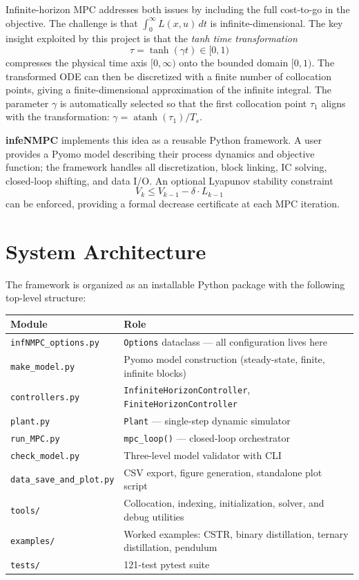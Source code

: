 \documentclass[11pt,letterpaper]{article}
\begin{document}
Infinite-horizon MPC addresses both issues by including the full cost-to-go in the objective. The challenge is that $\int_0^\infty L(x,u)\,dt$ is infinite-dimensional. The key insight exploited by this project is that the \emph{tanh time transformation}
\[
  \tau = \tanh(\gamma t) \in [0,1)
\]
compresses the physical time axis $[0,\infty)$ onto the bounded domain $[0,1)$. The transformed ODE can then be discretized with a finite number of collocation points, giving a finite-dimensional approximation of the infinite integral. The parameter $\gamma$ is automatically selected so that the first collocation point $\tau_1$ aligns with the transformation: $\gamma = \operatorname{atanh}(\tau_1)/T_s$.

\textbf{infeNMPC} implements this idea as a reusable Python framework. A user provides a Pyomo model describing their process dynamics and objective function; the framework handles all discretization, block linking, IC solving, closed-loop shifting, and data I/O. An optional Lyapunov stability constraint
\[
  V_k \leq V_{k-1} - \delta \cdot L_{k-1}
\]
can be enforced, providing a formal decrease certificate at each MPC iteration.

\section{System Architecture}

The framework is organized as an installable Python package with the following top-level structure:

\begin{center}
\begin{tabular}{ll}
\toprule
\textbf{Module} & \textbf{Role} \\
\midrule
\texttt{infNMPC\_options.py} & \texttt{Options} dataclass --- all configuration lives here \\
\texttt{make\_model.py} & Pyomo model construction (steady-state, finite, infinite blocks) \\
\texttt{controllers.py} & \texttt{InfiniteHorizonController}, \texttt{FiniteHorizonController} \\
\texttt{plant.py} & \texttt{Plant} --- single-step dynamic simulator \\
\texttt{run\_MPC.py} & \texttt{mpc\_loop()} --- closed-loop orchestrator \\
\texttt{check\_model.py} & Three-level model validator with CLI \\
\texttt{data\_save\_and\_plot.py} & CSV export, figure generation, standalone plot script \\
\texttt{tools/} & Collocation, indexing, initialization, solver, and debug utilities \\
\midrule
\texttt{examples/} & Worked examples: CSTR, binary distillation, ternary distillation, pendulum \\
\texttt{tests/} & 121-test pytest suite \\
\bottomrule
\end{tabular}
\end{center}
\end{document}

